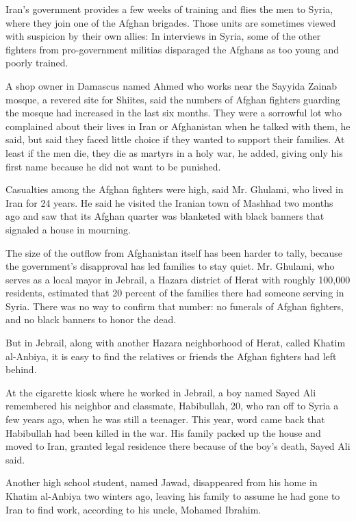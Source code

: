 Iran's government provides a few weeks of training and flies the men to
Syria, where they join one of the Afghan brigades. Those units are
sometimes viewed with suspicion by their own allies: In interviews in
Syria, some of the other fighters from pro-government militias
disparaged the Afghans as too young and poorly trained.

A shop owner in Damascus named Ahmed who works near the Sayyida Zainab
mosque, a revered site for Shiites, said the numbers of Afghan fighters
guarding the mosque had increased in the last six months. They were a
sorrowful lot who complained about their lives in Iran or Afghanistan
when he talked with them, he said, but said they faced little choice if
they wanted to support their families. At least if the men die, they die
as martyrs in a holy war, he added, giving only his first name because
he did not want to be punished.

Casualties among the Afghan fighters were high, said Mr. Ghulami, who
lived in Iran for 24 years. He said he visited the Iranian town of
Mashhad two months ago and saw that its Afghan quarter was blanketed
with black banners that signaled a house in mourning.

The size of the outflow from Afghanistan itself has been harder to
tally, because the government's disapproval has led families to stay
quiet. Mr. Ghulami, who serves as a local mayor in Jebrail, a Hazara
district of Herat with roughly 100,000 residents, estimated that 20
percent of the families there had someone serving in Syria. There was no
way to confirm that number: no funerals of Afghan fighters, and no black
banners to honor the dead.

But in Jebrail, along with another Hazara neighborhood of Herat, called
Khatim al-Anbiya, it is easy to find the relatives or friends the Afghan
fighters had left behind.

At the cigarette kiosk where he worked in Jebrail, a boy named Sayed Ali
remembered his neighbor and classmate, Habibullah, 20, who ran off to
Syria a few years ago, when he was still a teenager. This year, word
came back that Habibullah had been killed in the war. His family packed
up the house and moved to Iran, granted legal residence there because of
the boy's death, Sayed Ali said.

Another high school student, named Jawad, disappeared from his home in
Khatim al-Anbiya two winters ago, leaving his family to assume he had
gone to Iran to find work, according to his uncle, Mohamed Ibrahim.


